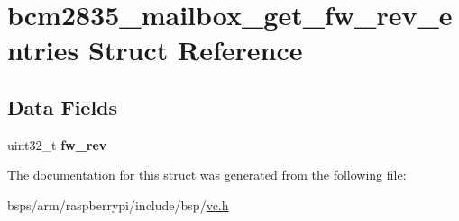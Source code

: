 \hypertarget{structbcm2835__mailbox__get__fw__rev__entries}{}\section{bcm2835\+\_\+mailbox\+\_\+get\+\_\+fw\+\_\+rev\+\_\+entries Struct Reference}
\label{structbcm2835__mailbox__get__fw__rev__entries}
\subsection*{Data Fields}
\begin{DoxyCompactItemize}
\item 
\mbox{\label{structbcm2835__mailbox__get__fw__rev__entries_ad60501859b993da8f4f6d586dce6ba5f}} 
uint32\+\_\+t {\bfseries fw\+\_\+rev}
\end{DoxyCompactItemize}


The documentation for this struct was generated from the following file\+:\begin{DoxyCompactItemize}
\item 
bsps/arm/raspberrypi/include/bsp/\mbox{\hyperlink{vc_8h}{vc.\+h}}\end{DoxyCompactItemize}
